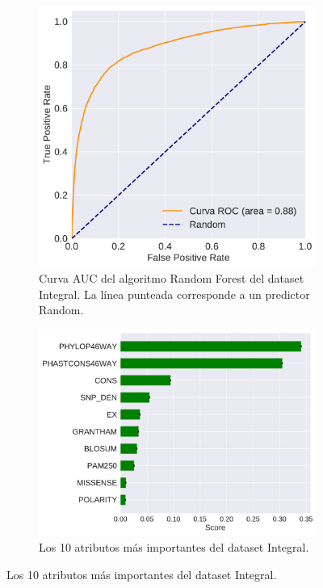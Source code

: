 \begin{figure}[H]
\centering
\begin{subfigure}[t]{0.7\textwidth}
    \centering
    \includegraphics[width=\textwidth]{documents/latex/figures/3/integral/auc_integral.pdf}
    \caption{Curva AUC del algoritmo Random Forest del dataset Integral. La línea punteada corresponde a un predictor Random.}
    \label{fig:auc_integral}
\end{subfigure}
\hfill
\hfill
\begin{subfigure}[b]{0.7\textwidth}
    \centering
    \includegraphics[width=\textwidth]{documents/latex/figures/3/integral/importances_integral.pdf}
    \caption{Los 10 atributos más importantes del dataset Integral.}
    \label{fig:importances_integral}
\end{subfigure}


\end{figure}

